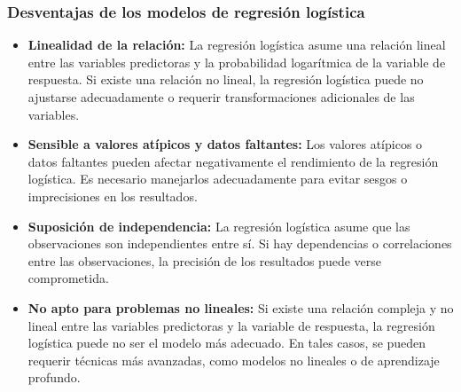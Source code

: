 \subsubsection{Desventajas de los modelos de regresión logística}
\begin{itemize}
        \item \textbf{Linealidad de la relación:} La regresión logística asume una relación lineal entre las variables predictoras y la probabilidad logarítmica de la variable de respuesta. Si existe una relación no lineal, la regresión logística puede no ajustarse adecuadamente o requerir transformaciones adicionales de las variables.
        \item \textbf{Sensible a valores atípicos y datos faltantes:} Los valores atípicos o datos faltantes pueden afectar negativamente el rendimiento de la regresión logística. Es necesario manejarlos adecuadamente para evitar sesgos o imprecisiones en los resultados.
        \item \textbf{Suposición de independencia:} La regresión logística asume que las observaciones son independientes entre sí. Si hay dependencias o correlaciones entre las observaciones, la precisión de los resultados puede verse comprometida.
        \item \textbf{No apto para problemas no lineales:} Si existe una relación compleja y no lineal entre las variables predictoras y la variable de respuesta, la regresión logística puede no ser el modelo más adecuado. En tales casos, se pueden requerir técnicas más avanzadas, como modelos no lineales o de aprendizaje profundo.
\end{itemize}
